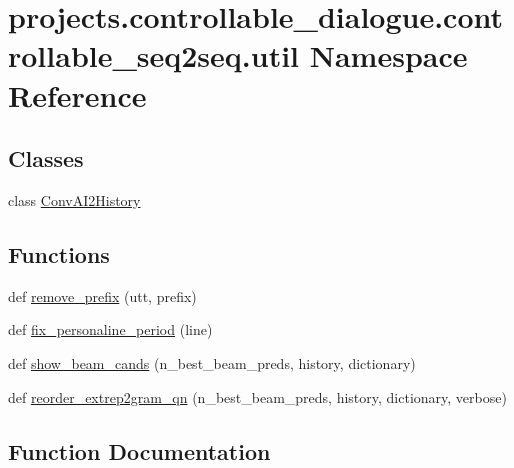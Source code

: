 \hypertarget{namespaceprojects_1_1controllable__dialogue_1_1controllable__seq2seq_1_1util}{}\section{projects.\+controllable\+\_\+dialogue.\+controllable\+\_\+seq2seq.\+util Namespace Reference}
\label{namespaceprojects_1_1controllable__dialogue_1_1controllable__seq2seq_1_1util}
\subsection*{Classes}
\begin{DoxyCompactItemize}
\item 
class \hyperlink{classprojects_1_1controllable__dialogue_1_1controllable__seq2seq_1_1util_1_1ConvAI2History}{Conv\+A\+I2\+History}
\end{DoxyCompactItemize}
\subsection*{Functions}
\begin{DoxyCompactItemize}
\item 
def \hyperlink{namespaceprojects_1_1controllable__dialogue_1_1controllable__seq2seq_1_1util_accba1ac2dc7bedf184abe7d46120861c}{remove\+\_\+prefix} (utt, prefix)
\item 
def \hyperlink{namespaceprojects_1_1controllable__dialogue_1_1controllable__seq2seq_1_1util_a21f7e685d288dffc51d76664b3f31859}{fix\+\_\+personaline\+\_\+period} (line)
\item 
def \hyperlink{namespaceprojects_1_1controllable__dialogue_1_1controllable__seq2seq_1_1util_ad8bee76107b49379c621746db6fd7d4e}{show\+\_\+beam\+\_\+cands} (n\+\_\+best\+\_\+beam\+\_\+preds, history, dictionary)
\item 
def \hyperlink{namespaceprojects_1_1controllable__dialogue_1_1controllable__seq2seq_1_1util_aa1ba917d170af0191d23b033358bc9eb}{reorder\+\_\+extrep2gram\+\_\+qn} (n\+\_\+best\+\_\+beam\+\_\+preds, history, dictionary, verbose)
\end{DoxyCompactItemize}


\subsection{Function Documentation}
\mbox{\label{namespaceprojects_1_1controllable__dialogue_1_1controllable__seq2seq_1_1util_a21f7e685d288dffc51d76664b3f31859}} 
